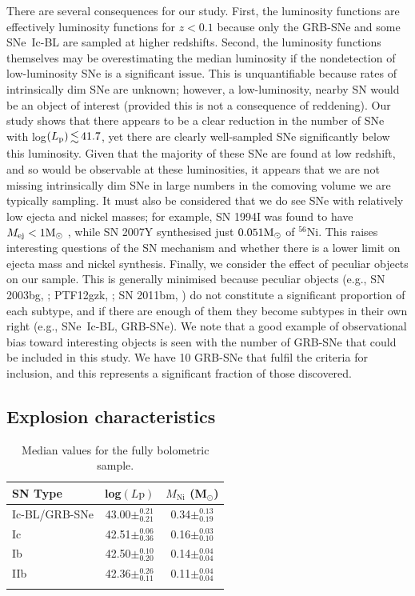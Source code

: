 \documentclass[a4paper,fleqn,usenatbib]{mnras}
\begin{document}
There are several consequences for our study. First, the luminosity functions are effectively luminosity functions for $z<0.1$ because only the GRB-SNe and some SNe~Ic-BL are sampled at higher redshifts. Second, the luminosity functions themselves may be overestimating the median luminosity if the nondetection of low-luminosity SNe is a significant issue. This is unquantifiable because rates of intrinsically dim SNe are unknown; however, a low-luminosity, nearby SN would be an object of interest (provided this is not a consequence of reddening). Our study shows that there appears to be a clear reduction in the number of SNe with log$(L_{\mathrm{p}}) \la 41.7$, yet there are clearly well-sampled SNe significantly below this luminosity. Given that the majority of these SNe are found at low redshift, and so would be observable at these luminosities, it appears that we are not missing intrinsically dim SNe in large numbers in the comoving volume we are typically sampling. It must also be considered that we do see SNe with relatively low ejecta and nickel masses; for example, SN 1994I was found to have $M_{\mathrm{ej}} <1 {\rm M}_{\odot}$ \citep{Iwamoto1994}, while SN 2007Y synthesised just $0.051 {\rm M}_{\odot}$ of $^{56}$Ni. This raises interesting questions of the SN mechanism and whether there is a lower limit on ejecta mass and nickel synthesis. Finally, we consider the effect of peculiar objects on our sample. This is generally minimised because peculiar objects (e.g., SN 2003bg, \citealt{Mazzali2009}; PTF12gzk, \citealt{BenAmi2012}; SN 2011bm, \citealt{Valenti2012}) do not constitute a significant proportion of each subtype, and if there are enough of them they become subtypes in their own right (e.g., SNe~Ic-BL, GRB-SNe).  We note that a good example of observational bias toward interesting objects is seen with the number of GRB-SNe that could be included in this study. We have 10 GRB-SNe that fulfil the criteria for inclusion, and this represents a significant fraction of those discovered.

\subsection{Explosion characteristics}
\begin{table}
 \centering
 \renewcommand{\arraystretch}{1.5}
 \begin{minipage}{90mm}
  \caption{Median values for the fully bolometric sample. }
 \begin{tabular}{lcc}
  \hline
 SN Type & log$(L{\mathrm{p}})$ & $M_{\mathrm{Ni}}$ (M$_{\odot}$) \\
  \hline
Ic-BL/GRB-SNe & 43.00$\pm^{0.21}_{0.21}$ & 0.34$\pm^{0.13}_{0.19}$\\
Ic & 42.51$\pm^{0.06}_{0.36}$ & 0.16$\pm^{0.03}_{0.10}$\\
Ib & 42.50$\pm^{0.10}_{0.20}$ & 0.14$\pm^{0.04}_{0.04}$\\
IIb & 42.36$\pm^{0.26}_{0.11}$& 0.11$\pm^{0.04}_{0.04}$\\
\hline
 \label{meanstats}
\end{tabular}
\end{minipage}
\end{table}
\end{document}
